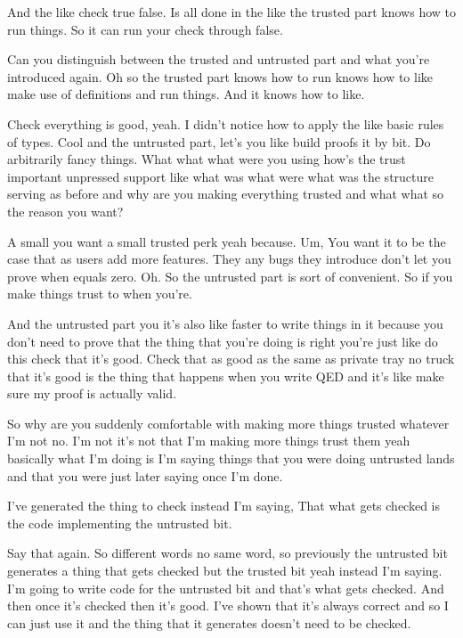 \begin{subappendices}
    And the like check true false. Is all done in the like the trusted part knows how to run things. So it can run your check through false. 
    
    Can you distinguish between the trusted and untrusted part and what you're introduced again. Oh so the trusted part knows how to run knows how to like make use of definitions and run things. And it knows how to like. 
    
    Check everything is good, yeah. I didn't notice how to apply the like basic rules of types. Cool and the untrusted part, let's you like build proofs it by bit. Do arbitrarily fancy things. What what what were you using how's the trust important unpressed support like what was what were what was the structure serving as before and why are you making everything trusted and what what so the reason you want? 
    
    A small you want a small trusted perk yeah because. Um, You want it to be the case that as users add more features. They any bugs they introduce don't let you prove when equals zero. Oh. So the untrusted part is sort of convenient. So if you make things trust to when you're. 
    
    And the untrusted part you it's also like faster to write things in it because you don't need to prove that the thing that you're doing is right you're just like do this check that it's good. Check that as good as the same as private tray no truck that it's good is the thing that happens when you write QED and it's like make sure my proof is actually valid. 
    
    So why are you suddenly comfortable with making more things trusted whatever I'm not no. I'm not it's not that I'm making more things trust them yeah basically what I'm doing is I'm saying things that you were doing untrusted lands and that you were just later saying once I'm done. 
    
    I've generated the thing to check instead I'm saying, That what gets checked is the code implementing the untrusted bit. 
    
    Say that again. So different words no same word, so previously the untrusted bit generates a thing that gets checked but the trusted bit yeah instead I'm saying. I'm going to write code for the untrusted bit and that's what gets checked. And then once it's checked then it's good. I've shown that it's always correct and so I can just use it and the thing that it generates doesn't need to be checked. 
    

\end{subappendices}
